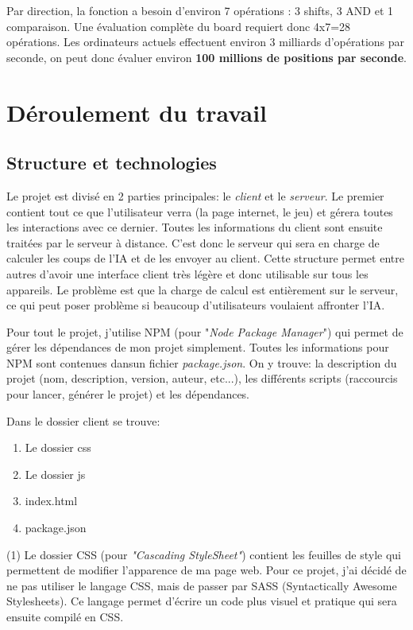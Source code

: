 \documentclass[a4paper]{article}
\begin{document}
    Par direction, la fonction a besoin d'environ 7 opérations : 3 shifts, 3 AND et 1 comparaison. Une évaluation complète du board requiert donc 4x7=28 opérations. Les ordinateurs actuels effectuent environ 3 milliards d'opérations par seconde, on peut donc évaluer environ \textbf{100 millions de positions par seconde}.

\section{Déroulement du travail}

\subsection{Structure et technologies}

	Le projet est divisé en 2 parties principales: le \textit{client} et le \textit{serveur}. Le premier contient tout ce que l'utilisateur verra (la page internet, le jeu) et gérera toutes les interactions avec ce dernier. Toutes les informations du client sont ensuite traitées par le serveur à distance. C'est donc le serveur qui sera en charge de calculer les coups de l'IA et de les envoyer au client. Cette structure permet entre autres d'avoir une interface client très légère et donc utilisable sur tous les appareils. Le problème est que la charge de calcul est entièrement sur le serveur, ce qui peut poser problème si beaucoup d'utilisateurs voulaient affronter l'IA.

	Pour tout le projet, j'utilise NPM (pour  "\textit{Node Package Manager}") qui permet de gérer les dépendances de mon projet simplement. Toutes les informations pour NPM sont contenues dansun fichier \textit{package.json}. On y trouve: la description du projet (nom, description, version, auteur, etc...), les différents scripts (raccourcis pour lancer, générer le projet) et les dépendances.

	Dans le dossier client se trouve:
	\begin{enumerate}
		\item Le dossier css
		\item Le dossier js
		\item index.html
		\item package.json
	\end{enumerate}
	
	(1) Le dossier CSS (pour \textit{"Cascading StyleSheet"}) contient les feuilles de style qui permettent de modifier l'apparence de ma page web. Pour ce projet, j'ai décidé de ne pas utiliser le langage CSS, mais de passer par SASS (Syntactically Awesome Stylesheets). Ce langage permet d'écrire un code plus visuel et pratique qui sera ensuite compilé en CSS.
\end{document}
